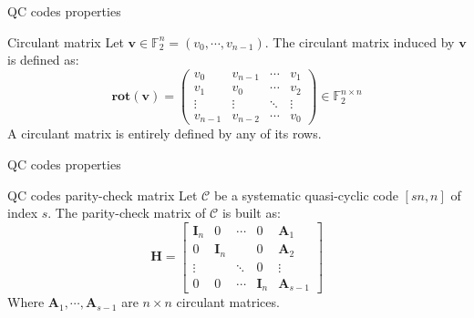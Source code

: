 \begin{frame}{QC codes properties}
    \begin{block}{Circulant matrix}
        Let $\mathbf{v} \in \mathds{F}_2^n = (v_0, \cdots, v_{n-1})$. The circulant matrix induced by $\mathbf{v}$ is defined as:
        \begin{equation*}
            \mathbf{rot(v)} = \begin{pmatrix}
                v_0 & v_{n-1} & \cdots & v_1 \\
                v_1 & v_0 & \cdots & v_2 \\
                \vdots & \vdots & \ddots & \vdots \\
                v_{n-1} & v_{n-2} & \cdots & v_0
                \end{pmatrix} \in \mathds{F}_2^{n\times n}
        \end{equation*}
        A circulant matrix is entirely defined by any of its rows.
    \end{block}
\end{frame}

\begin{frame}{QC codes properties}
    \begin{block}{QC codes parity-check matrix}
        Let $\mathcal{C}$ be a systematic quasi-cyclic code $[sn, n]$ of index $s$. The parity-check matrix of $\mathcal{C}$ is built as:
        \begin{equation*}
            \mathbf{H} =
            \begin{bmatrix}
                \mathbf{I}_n & 0 & \cdots & 0 & \mathbf{A}_1 \\
                0 & \mathbf{I}_n &  & 0 & \mathbf{A}_2 \\
                \vdots &  & \ddots & 0 & \vdots \\
                0 & 0 & \cdots  & \mathbf{I}_n & \mathbf{A}_{s-1} 
                \end{bmatrix}
        \end{equation*}
        Where $\mathbf{A}_1, \cdots, \mathbf{A}_{s-1}$ are $n \times n$ circulant matrices.
    \end{block}
\end{frame}

